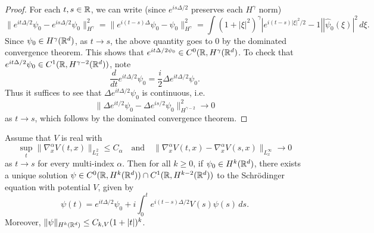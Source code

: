 \begin{proof}
  For each $t, s \in \mathbb{R}$, we can write (since
  $e^{is\Delta / 2}$ preserves each $H^\gamma$ norm)
  \[
    \|e^{it\Delta / 2} \psi_0 - e^{is\Delta / 2} \psi_0\|_{H^\gamma}^2
    = \|e^{i(t - s)\Delta} \psi_0 - \psi_0\|_{H^\gamma}^2
    = \int (1 + |\xi|^2)^{\gamma} |e^{i(t - s)|\xi|^2 / 2} - 1| |\widehat{\psi}_0(\xi)|^2\, d\xi.
  \]
  Since $\psi_0 \in H^\gamma(\mathbb{R}^d)$,
  as $t \to s$, the above quantity goes to $0$
  by the dominated convergence theorem. This shows that
  $e^{it\Delta / 2 \psi_0} \in C^0(\mathbb{R}, H^\gamma(\mathbb{R}^d)$.
  To check that $e^{it\Delta / 2} \psi_0 \in C^1(\mathbb{R}, H^{\gamma - 2}(\mathbb{R}^d))$, note
  \[
    \frac{d}{dt} e^{it\Delta / 2} \psi_0
    = \frac{i}{2} \Delta e^{it\Delta / 2} \psi_0.
  \]
  Thus it suffices to see that $\Delta e^{it\Delta / 2} \psi_0$ is continuous, i.e.
  \[
    \|\Delta e^{it / 2} \psi_0 - \Delta e^{is / 2} \psi_0\|_{H^{\gamma - 2}}^2 \to 0
  \]
  as $t \to s$, which follows by the dominated
  convergence theorem.
\end{proof}

\begin{theorem}
  Assume that $V$ is real with
  \[
    \sup_{t} \|\nabla_x^\alpha V(t, x) \|_{L^2_x} \le C_\alpha
    \quad \text{and} \quad
    \|\nabla_x^\alpha V(t, x) - \nabla_x^\alpha V(s, x)\|_{L^\infty_x} \to 0
  \]
  as $t \to s$ for every multi-index $\alpha$.
  Then for all $k \ge 0$, if $\psi_0 \in H^k(\mathbb{R}^d)$,
  there exists a unique solution
  $\psi \in C^0(\mathbb{R}, H^k(\mathbb{R}^d)) \cap C^1(\mathbb{R}, H^{k - 2}(\mathbb{R}^d))$
  to the Schr\"odinger equation with potential $V$,
  given by
  \[
    \psi(t) = e^{it\Delta / 2} \psi_0 + i \int_0^t e^{i(t - s)\Delta / 2} V(s) \psi(s)\, ds.
  \]
  Moreover, $\|\psi\|_{H^k(\mathbb{R}^d)} \le C_{k, V} (1 + |t|)^k$.
\end{theorem}

